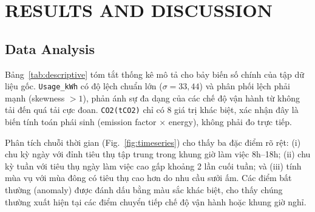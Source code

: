 \section{RESULTS AND DISCUSSION}
\label{sec:results}

\subsection{Data Analysis}

Bảng~\ref{tab:descriptive} tóm tắt thống kê mô tả cho bảy biến số chính của tập dữ liệu gốc.
\texttt{Usage\_kWh} có độ lệch chuẩn lớn ($\sigma = 33{,}44$) và phân phối lệch phải mạnh (skewness $> 1$),
phản ánh sự đa dạng của các chế độ vận hành từ không tải đến quá tải cực đoan.
\texttt{CO2(tCO2)} chỉ có 8 giá trị khác biệt, xác nhận đây là biến tính toán phái sinh (emission factor $\times$ energy),
không phải đo trực tiếp.

\begin{table}[htbp]
\caption{THỐNG KÊ MÔ TẢ DỮ LIỆU GỐC}
\label{tab:descriptive}
\centering
\small
{}
\end{table}

Phân tích chuỗi thời gian (Fig.~\ref{fig:timeseries}) cho thấy ba đặc điểm rõ rệt:
(i) chu kỳ ngày với đỉnh tiêu thụ tập trung trong khung giờ làm việc 8h--18h;
(ii) chu kỳ tuần với tiêu thụ ngày làm việc cao gấp khoảng 2 lần cuối tuần;
và (iii) tính mùa vụ với mùa đông có tiêu thụ cao hơn do nhu cầu sưởi ấm.
Các điểm bất thường (anomaly) được đánh dấu bằng màu sắc khác biệt,
cho thấy chúng thường xuất hiện tại các điểm chuyển tiếp chế độ vận hành hoặc khung giờ nghỉ.

